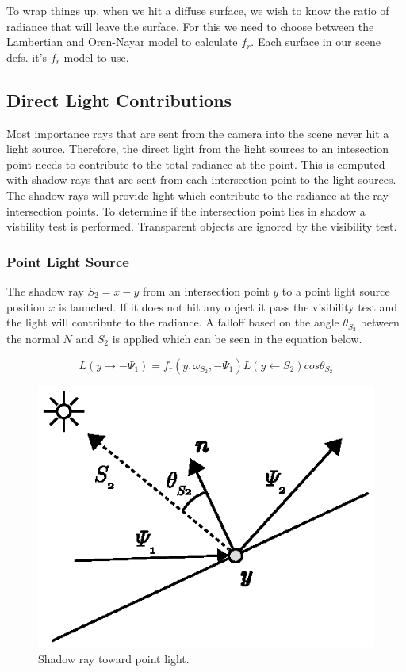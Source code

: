 \documentclass[a4paper, twocolumn]{article}
\begin{document}
                To wrap things up, when we hit a diffuse surface, we wish to know the ratio of radiance that will leave the surface. For this we need to choose between the Lambertian and Oren-Nayar model to calculate \(f_r\). Each surface in our scene defs. it's \(f_r\) model to use.

        \subsection{Direct Light Contributions} \label{sec:direct_light_contributions}
        Most importance rays that are sent from the camera into the scene never hit a light source. Therefore, the direct light from the light sources to an intesection point needs to contribute to the total radiance at the point. This is computed with shadow rays that are sent from each intersection point to the light sources. The shadow rays will provide light which contribute to the radiance at the ray intersection points. To determine if the intersection point lies in shadow a visbility test is performed. Transparent objects are ignored by the visibility test.
            \subsubsection{Point Light Source} \label{sec:point_light_source}
            The shadow ray $S_2 = x - y$ from an intersection point $y$ to a point light source position $x$ is launched. If it does not hit any object it pass the visibility test and the light will contribute to the radiance. A falloff based on the angle $\theta_{S_2}$ between the normal $N$ and $S_2$ is applied which can be seen in the equation below.

            \begin{equation*}
              L(y \rightarrow -\Psi_1) = f_r(y, \omega_{S_2}, -\Psi_1) L(y \leftarrow S_2) cos\theta_{S_2}
            \end{equation*}
            
            \begin{figure}[ht]
              \centering
              \includegraphics[width=0.9\linewidth]{share/shadow_ray.eps}
              \caption{Shadow ray toward point light.}
            \end{figure}
\end{document}
